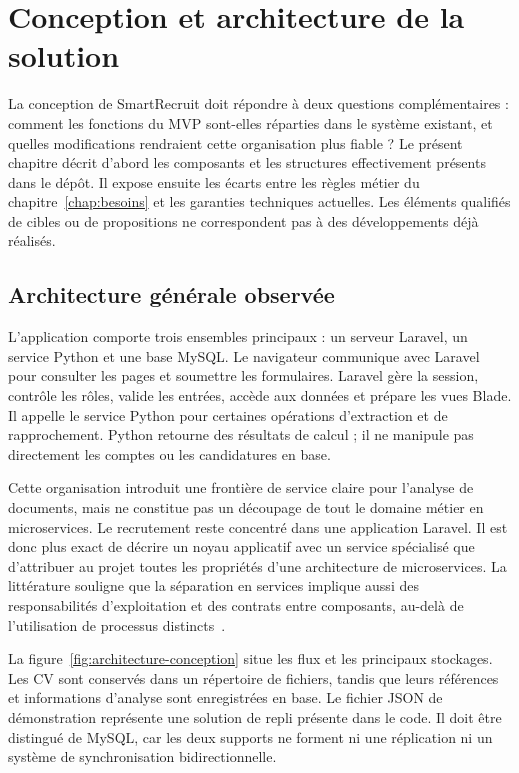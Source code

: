 \chapter{Conception et architecture de la solution}
\label{chap:conception}

La conception de SmartRecruit doit répondre à deux questions complémentaires : comment les fonctions du MVP sont-elles réparties dans le système existant, et quelles modifications rendraient cette organisation plus fiable ? Le présent chapitre décrit d'abord les composants et les structures effectivement présents dans le dépôt. Il expose ensuite les écarts entre les règles métier du chapitre~\ref{chap:besoins} et les garanties techniques actuelles. Les éléments qualifiés de cibles ou de propositions ne correspondent pas à des développements déjà réalisés.

\section{Architecture générale observée}

L'application comporte trois ensembles principaux : un serveur Laravel, un service Python et une base MySQL. Le navigateur communique avec Laravel pour consulter les pages et soumettre les formulaires. Laravel gère la session, contrôle les rôles, valide les entrées, accède aux données et prépare les vues Blade. Il appelle le service Python pour certaines opérations d'extraction et de rapprochement. Python retourne des résultats de calcul ; il ne manipule pas directement les comptes ou les candidatures en base.

Cette organisation introduit une frontière de service claire pour l'analyse de documents, mais ne constitue pas un découpage de tout le domaine métier en microservices. Le recrutement reste concentré dans une application Laravel. Il est donc plus exact de décrire un noyau applicatif avec un service spécialisé que d'attribuer au projet toutes les propriétés d'une architecture de microservices. La littérature souligne que la séparation en services implique aussi des responsabilités d'exploitation et des contrats entre composants, au-delà de l'utilisation de processus distincts~\cite{fowler2014}.

La figure~\ref{fig:architecture-conception} situe les flux et les principaux stockages. Les CV sont conservés dans un répertoire de fichiers, tandis que leurs références et informations d'analyse sont enregistrées en base. Le fichier JSON de démonstration représente une solution de repli présente dans le code. Il doit être distingué de MySQL, car les deux supports ne forment ni une réplication ni un système de synchronisation bidirectionnelle.

